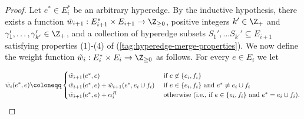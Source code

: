 \documentclass{article}
\begin{document}
\begin{proof}
    Let $e^* \in E_i^*$ be an arbitrary hyperedge.
    By the inductive hypothesis, there exists a function $\Tilde{w}_{i+1}:E^*_{i+1}\times E_{i+1} \rightarrow \Z_{\geq 0}$, positive integers $k' \in \Z_+$ and $\gamma_1', \ldots, \gamma_{k'}' \in \Z_+$, and a collection of hyperedge subsets $S_1', \ldots S_{k'}' \subseteq E_{i+1}$ satisfying properties (1)-(4) of (\ref{tag:hyperedge-merge-properties}).
    We now define the weight function $\Tilde{w}_i:E^*_{i}\times E_{i} \rightarrow \Z_{\geq 0}$ as follows. 
    For every $e \in E_i$ we let



$$\Tilde{w}_i(e^*, e) \coloneqq  \begin{cases}
        \Tilde{w}_{i+1}(e^*, e)&\text{ if } e \not\in \{e_i, f_i\}\\
        \Tilde{w}_{i+1}(e^*, e) + \Tilde{w}_{i+1}(e^*, e_i \cup f_i)&\text{ if } e \in \{e_i, f_i\} \text{ and } e^* \not = e_i\cup f_i\\
        \Tilde{w}_{i+1}(e^*, e) + \alpha_i^R& \text{ otherwise (i.e., if $e \in \{e_i, f_i\}$ and $e^* = e_i \cup f_i$).}
    \end{cases}$$


\end{proof}
\end{document}
